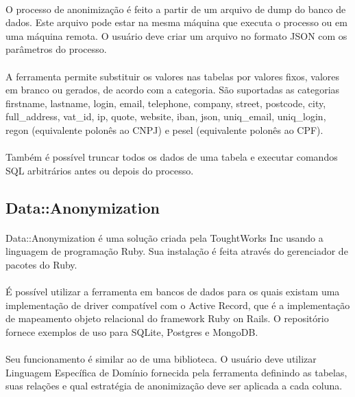 \paragraph{} O processo de anonimização é feito a partir de um arquivo de dump do banco de dados. Este arquivo pode estar na mesma máquina que executa o processo ou em uma máquina remota. O usuário deve criar um arquivo no formato JSON com os parâmetros do processo.

\paragraph{} A ferramenta permite substituir os valores nas tabelas por valores fixos, valores em branco ou gerados, de acordo com a categoria. São suportadas as categorias firstname, lastname, login, email, telephone, company, street, postcode, city, full{\_}address, vat{\_}id, ip, quote, website, iban, json, uniq{\_}email, uniq{\_}login, regon (equivalente polonês ao CNPJ) e pesel (equivalente polonês ao CPF). 

\paragraph{} Também é possível truncar todos os dados de uma tabela e executar comandos SQL arbitrários antes ou depois do processo.

\subsection{Data::Anonymization}


\paragraph{} Data::Anonymization\cite{data-anon-repository} é uma solução criada pela ToughtWorks Inc usando a linguagem de programação Ruby. Sua instalação é feita através do gerenciador de pacotes do Ruby.

\paragraph{} É possível utilizar a ferramenta em bancos de dados para os quais existam uma implementação de driver compatível com o Active Record\cite{active-record}, que é a implementação de mapeamento objeto relacional do framework Ruby on Rails. O repositório fornece exemplos de uso para SQLite, Postgres e MongoDB.

\paragraph{} Seu funcionamento é similar ao de uma biblioteca. O usuário deve utilizar Linguagem Específica de Domínio fornecida pela ferramenta definindo as tabelas, suas relações e qual estratégia de anonimização deve ser aplicada a cada coluna.

